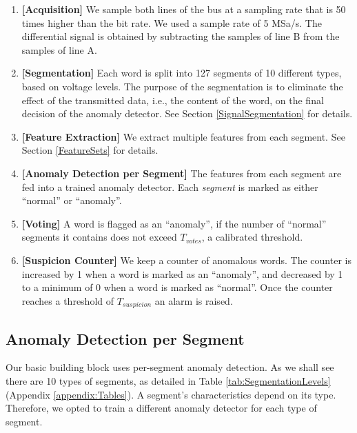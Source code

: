 \documentclass[english]{llncs}
\newcommand{\sublevel}[1]{\subsection{#1}}
\newcommand{\sublevel}[1]{\section{#1}}
\begin{document}
  \begin{enumerate}
  \vspace*{-1ex} %
    \item \textbf{[Acquisition]}
          We sample both lines of the bus at a sampling rate that is 50 times higher than the bit rate. We used a sample rate of 5 MSa/s. The differential signal is obtained by subtracting the samples of line B from the samples of line A.
    \item \textbf{[Segmentation]}
          Each word is split into 127 segments of 10 different types, based on voltage levels. The purpose of the segmentation is to eliminate the effect of the transmitted data, i.e., the content of the word, on the final decision of the anomaly detector. See Section \ref{SignalSegmentation} for details.
    \item \textbf{[Feature Extraction]}
          We extract multiple features from each segment. See Section \ref{FeatureSets} for details.
    \item \textbf{[Anomaly Detection per Segment]}
          The features from each segment are fed into a trained anomaly detector. Each \textit{segment} is marked as either ``normal'' or ``anomaly''.
    \item \textbf{[Voting]}
          A word is flagged as an ``anomaly'', if the number of ``normal'' segments it contains does not exceed $T_{votes}$, a calibrated threshold.
    \item \textbf{[Suspicion Counter]}
          We keep a counter of anomalous words. The counter is increased by 1 when a word is marked as an ``anomaly'', and decreased by 1  to a minimum of 0 when a word is marked as ``normal''. Once the counter reaches a threshold of $T_{suspicion}$ an alarm is raised.
  \end{enumerate}

  
\sublevel{Anomaly Detection per Segment}
  Our basic building block uses per-segment anomaly detection. As we shall see there are 10 types of segments, as detailed in Table \ref{tab:SegmentationLevels} (Appendix \ref{appendix:Tables}). A segment's characteristics depend on its type. Therefore, we opted to train a different anomaly detector for each type of segment.
  
\end{document}
